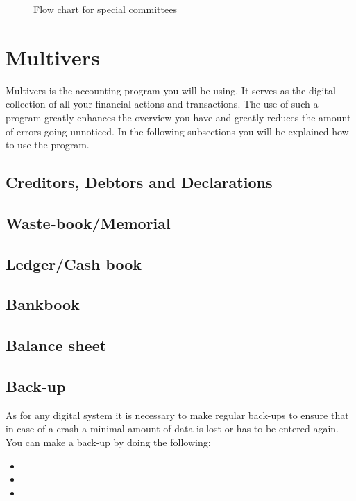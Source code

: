 \documentclass{report}
\newcommand{\mychapter}[2]{
    \setcounter{chapter}{#1}
    \setcounter{section}{0}
    \chapter*{#2}
    \addcontentsline{toc}{chapter}{#2}
}
\begin{document}
\begin{figure}
\centering
{}
\caption{Flow chart for special committees}
\end{figure}


\newpage
\mychapter{2}{Multivers}
Multivers is the accounting program you will be using. It serves as the digital collection of all your financial actions and transactions. The use of such a program greatly enhances the overview you have and greatly reduces the amount of errors going unnoticed. In the following subsections you will be explained how to use the program.
\section{Creditors, Debtors and Declarations}
\section{Waste-book/Memorial}
\section{Ledger/Cash book}
\section{Bankbook}
\section{Balance sheet}
\section{Back-up}
As for any digital system it is necessary to make regular back-ups to ensure that in case of a crash a minimal amount of data is lost or has to be entered again. You can make a back-up by doing the following:
\begin{itemize}
	\item 
	\item 
	\item 
\end{itemize} 
\end{document}
